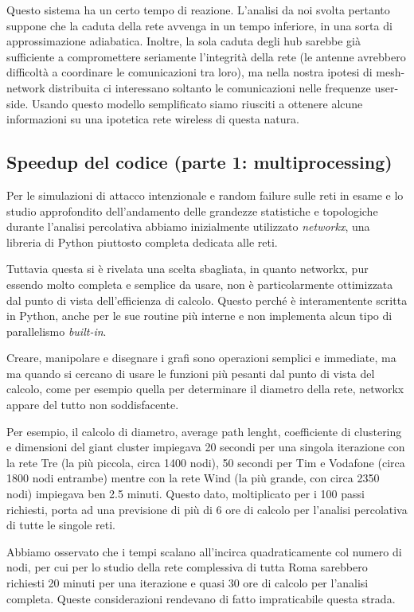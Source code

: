 Questo sistema ha un certo tempo di reazione. L'analisi da noi svolta pertanto suppone che la caduta della rete avvenga in un tempo inferiore, in una sorta di approssimazione adiabatica. Inoltre, la sola caduta degli hub sarebbe già sufficiente a compromettere seriamente l'integrità della rete (le antenne avrebbero difficoltà a coordinare le comunicazioni tra loro), ma nella nostra ipotesi di mesh-network distribuita ci interessano soltanto le comunicazioni nelle frequenze user-side. Usando questo modello semplificato siamo riusciti a ottenere alcune informazioni su una ipotetica rete wireless di questa natura.


\subsection{Speedup del codice (parte 1: multiprocessing)}

Per le simulazioni di attacco intenzionale e random failure sulle reti in esame e lo studio approfondito dell'andamento delle grandezze statistiche e topologiche durante l'analisi percolativa abbiamo inizialmente utilizzato \emph{networkx}, una libreria di Python piuttosto completa dedicata alle reti.

Tuttavia questa si è rivelata una scelta sbagliata, in quanto networkx, pur essendo molto completa e semplice da usare, non è particolarmente ottimizzata dal punto di vista dell'efficienza di calcolo. Questo perché è interamentente scritta in Python, anche per le sue routine più interne e non implementa alcun tipo di parallelismo \emph{built-in}.

Creare, manipolare e disegnare i grafi sono operazioni semplici e immediate, ma ma quando si cercano di usare le funzioni più pesanti dal punto di vista del calcolo, come per esempio quella per determinare il diametro della rete, networkx appare del tutto non soddisfacente.

Per esempio, il calcolo di diametro, average path lenght, coefficiente di clustering e dimensioni del giant cluster impiegava 20 secondi per una singola iterazione con la rete Tre (la più piccola, circa 1400 nodi), 50 secondi per Tim e Vodafone (circa 1800 nodi entrambe) mentre con la rete Wind (la più grande, con circa 2350 nodi) impiegava ben 2.5 minuti. Questo dato, moltiplicato per i 100 passi richiesti, porta ad una previsione di più di 6 ore di calcolo per l'analisi percolativa di tutte le singole reti.

Abbiamo osservato che i tempi scalano all'incirca quadraticamente col numero di nodi, per cui per lo studio della rete complessiva di tutta Roma sarebbero richiesti 20 minuti per una iterazione e quasi 30 ore di calcolo per l'analisi completa. Queste considerazioni rendevano di fatto impraticabile questa strada.

